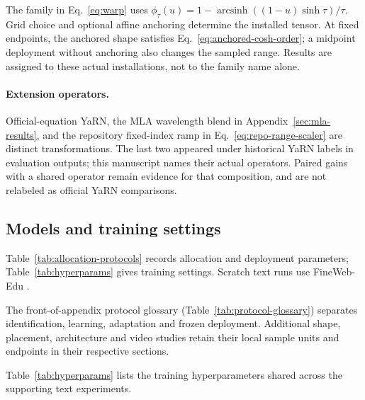 The family in Eq.~\eqref{eq:warp} uses $\phi_\tau(u)=1-\operatorname{arcsinh}((1-u)\sinh\tau)/\tau$. Grid choice and optional affine anchoring determine the installed tensor. At fixed endpoints, the anchored shape satisfies Eq.~\eqref{eq:anchored-cosh-order}; a midpoint deployment without anchoring also changes the sampled range. Results are assigned to these actual installations, not to the family name alone.

\paragraph{Extension operators.}
Official-equation YaRN, the MLA wavelength blend in Appendix~\ref{sec:mla-results}, and the repository fixed-index ramp in Eq.~\eqref{eq:repo-range-scaler} are distinct transformations. The last two appeared under historical YaRN labels in evaluation outputs; this manuscript names their actual operators. Paired gains with a shared operator remain evidence for that composition, and are not relabeled as official YaRN comparisons.

\FloatBarrier
\subsection{Models and training settings}

Table~\ref{tab:allocation-protocols} records allocation and deployment parameters; Table~\ref{tab:hyperparams} gives training settings.
Scratch text runs use FineWeb-Edu \citep{penedo2024fineweb}.

The front-of-appendix protocol glossary (Table~\ref{tab:protocol-glossary}) separates identification, learning, adaptation and frozen deployment. Additional shape, placement, architecture and video studies retain their local sample units and endpoints in their respective sections.


Table~\ref{tab:hyperparams} lists the training hyperparameters shared across
the supporting text experiments.


